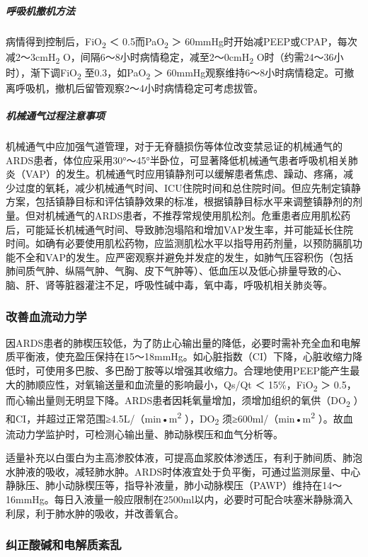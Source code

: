 \subparagraph{呼吸机撤机方法}

病情得到控制后，FiO\textsubscript{2} ＜ 0.5而PaO\textsubscript{2} ＞
60mmHg时开始减PEEP或CPAP，每次减2～3cmH\textsubscript{2}
O，间隔6～8小时病情稳定，减至2～0cmH\textsubscript{2}
O时（约需24～36小时），渐下调FiO\textsubscript{2}
至0.3，如PaO\textsubscript{2} ＞
60mmHg观察维持6～8小时病情稳定。可撤离呼吸机，撤机后留管观察2～4小时病情稳定可考虑拔管。

\subparagraph{机械通气过程注意事项}

机械通气中应加强气道管理，对于无脊髓损伤等体位改变禁忌证的机械通气的ARDS患者，体位应采用30°～45°半卧位，可显著降低机械通气患者呼吸机相关肺炎（VAP）的发生。机械通气时应用镇静剂可以缓解患者焦虑、躁动、疼痛，减少过度的氧耗，减少机械通气时间、ICU住院时间和总住院时间。但应先制定镇静方案，包括镇静目标和评估镇静效果的标准，根据镇静目标水平来调整镇静剂的剂量。但对机械通气的ARDS患者，不推荐常规使用肌松剂。危重患者应用肌松药后，可能延长机械通气时间、导致肺泡塌陷和增加VAP发生率，并可能延长住院时间。如确有必要使用肌松药物，应监测肌松水平以指导用药剂量，以预防膈肌功能不全和VAP的发生。应严密观察并避免并发症的发生，如肺气压容积伤（包括肺间质气肿、纵隔气肿、气胸、皮下气肿等）、低血压以及低心排量导致的心、脑、肝、肾等脏器灌注不足，呼吸性碱中毒，氧中毒，呼吸机相关肺炎等。

\subsubsection{改善血流动力学}

因ARDS患者的肺楔压较低，为了防止心输出量的降低，必要时需补充全血和电解质平衡液，使充盈压保持在15～18mmHg。如心脏指数（CI）下降，心脏收缩力降低时，可使用多巴胺、多巴酚丁胺等以增强其收缩力。合理地使用PEEP能产生最大的肺顺应性，对氧输送量和血流量的影响最小，Qs/Qt
＜ 15\%，FiO\textsubscript{2} ＞
0.5，而心输出量则无明显下降。ARDS患者因耗氧量增加，须增加组织的氧供（DO\textsubscript{2}
）和CI，并超过正常范围≥4.5L/（min•m\textsuperscript{2}
），DO\textsubscript{2} 须≥600ml/（min•m\textsuperscript{2}
）。故血流动力学监护时，可检测心输出量、肺动脉楔压和血气分析等。

适量补充以白蛋白为主高渗胶体液，可提高血浆胶体渗透压，有利于肺间质、肺泡水肿液的吸收，减轻肺水肿。ARDS时体液宜处于负平衡，可通过监测尿量、中心静脉压、肺小动脉楔压等，指导补液量，肺小动脉楔压（PAWP）维持在14～16mmHg。每日入液量一般应限制在2500ml以内，必要时可配合呋塞米静脉滴入利尿，利于肺水肿的吸收，并改善氧合。

\subsubsection{纠正酸碱和电解质紊乱}

